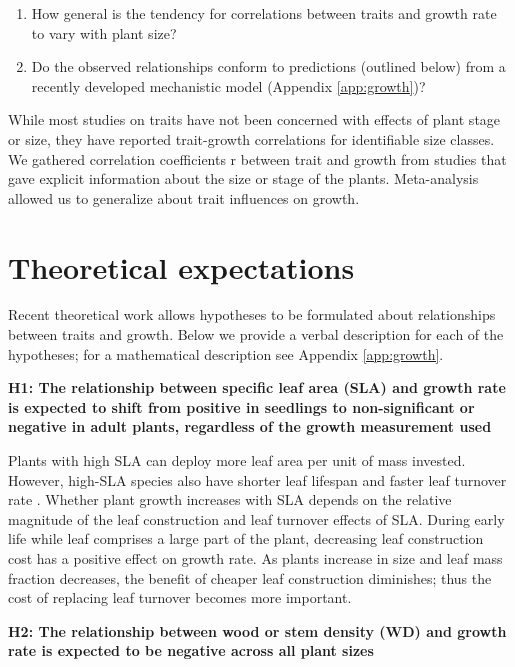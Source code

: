 \documentclass[a4paper]{article}\usepackage[]{graphicx}\usepackage[]{color}
\begin{document}
\begin{enumerate}
  \item How general is the tendency for correlations between traits and growth rate to vary with plant size?
  \item Do the observed relationships conform to predictions (outlined below) from a recently developed  mechanistic
model \citep{Falster:2011ii, falster:2013}(Appendix \ref{app:growth})?
\end{enumerate}

While most studies on traits have not been concerned with effects of plant stage or size, they have reported trait-growth correlations for identifiable size classes. We gathered correlation coefficients r between trait and growth from studies that gave explicit information about the size or stage of the plants. Meta-analysis allowed us to generalize about trait influences on growth. 

\section*{Theoretical expectations}\label{theory}

Recent theoretical work \citep{Falster:2011ii} allows hypotheses to be formulated about relationships between traits and growth. Below we provide a verbal description for each of the hypotheses; for a mathematical description see Appendix \ref{app:growth}.

\textbf{H1: The relationship between specific leaf area (SLA) and growth rate is expected to shift from positive in seedlings to non-significant or negative in adult plants, regardless of the growth measurement used}

Plants with high SLA can deploy more leaf area per unit of mass invested. However, high-SLA species also have shorter leaf lifespan and faster leaf turnover rate \citep{Wright:2004jb}. Whether plant growth increases with SLA depends on the relative magnitude of the leaf construction and leaf turnover effects of SLA. During early life while leaf comprises a large part of the plant, decreasing leaf construction cost has a positive effect on growth rate. As plants increase in size and leaf mass fraction decreases, the benefit of cheaper leaf construction diminishes; thus the cost of replacing leaf turnover becomes more important.

\textbf{H2: The relationship between wood or stem density (WD) and growth rate is expected to be negative across all plant sizes}
\end{document}
